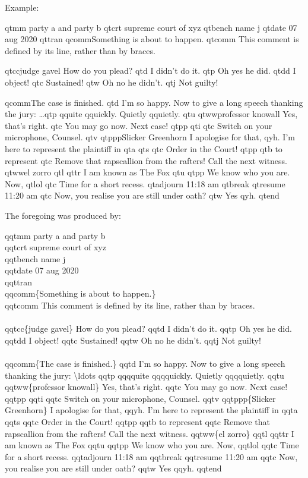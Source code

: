 \documentclass{article}
\begin{document}
\noindent Example:

qtmm party a and party b
qtcrt supreme court of xyz
qtbench name j
qtdate 07 aug 2020
qttran
qcomm{Something is about to happen.}
qtcomm This comment is defined by its line, rather than by braces.

qtcc{judge gavel} How do you plead? qtd I didn't do it. qtp Oh yes he did. qtdd I object! qtc Sustained! qtw Oh no he didn't. qtj  Not guilty! 

qcomm{The case is finished.} qtd I'm so happy. Now to give a long speech thanking the jury: \ldots qtp qquite qquickly. Quietly qquietly. qtu 
 qtww{professor knowall} Yes, that's right. qtc You may go now. Next case! qtpp qti qtc Switch on your microphone, Counsel. qtv qtppp{Slicker Greenhorn} I apologise for that,  qyh. I'm here to represent the plaintiff in qta qts qtc Order in the Court! qtpp qtb to represent qtc Remove that rapscallion from the rafters! Call the next witness. qtww{el zorro} qtl qttr I am known as The Fox qtu qtpp We know who you are. Now, qtlol qtc Time for a short recess. qtadjourn 11:18 am qtbreak qtresume 11:20 am qtc Now, you realise you are still under oath? qtw Yes qyh. qtend

The foregoing was produced by:
\begin{framed}\begin{qquotation}
qqtmm party a and party b\\
qqtcrt supreme court of xyz\\
qqtbench name j\\
qqtdate 07 aug 2020\\
qqttran\\
qqcomm\{Something is about to happen.\}\\
qqtcomm This comment is defined by its line, rather than by braces.\\
\ \\
qqtcc\{judge gavel\} How do you plead? qqtd I didn't do it. qqtp Oh yes he did. qqtdd I object! qqtc Sustained! qqtw Oh no he didn't. qqtj  Not guilty!\\ 
\ \\
qqcomm\{The case is finished.\} qqtd I'm so happy. Now to give a long speech thanking the jury: \textbackslash ldots qqtp qqqquite qqqquickly. Quietly qqqquietly. qqtu 
 qqtww\{professor knowall\} Yes, that's right. qqtc You may go now. Next case! qqtpp qqti qqtc Switch on your microphone, Counsel. qqtv qqtppp\{Slicker Greenhorn\} I apologise for that,  qqyh. I'm here to represent the plaintiff in qqta qqts qqtc Order in the Court! qqtpp qqtb to represent qqtc Remove that rapscallion from the rafters! Call the next witness. qqtww\{el zorro\} qqtl qqttr I am known as The Fox qqtu qqtpp We know who you are. Now, qqtlol qqtc Time for a short recess. qqtadjourn 11:18 am qqtbreak qqtresume 11:20 am qqtc Now, you realise you are still under oath? qqtw Yes qqyh. qqtend
\end{qquotation}\end{framed}
\end{document}
